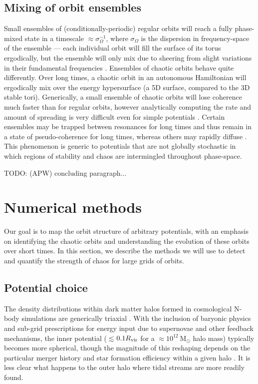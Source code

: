 \documentclass[letterpaper,12pt,preprint]{aastex}
\newcommand{\msun}{\ensuremath{\mathrm{M}_\odot}}
\newcommand{\todo}[2]{{\color{red} TODO: (\MakeUppercase{#1}) #2}}
\begin{document}
\subsection{Mixing of orbit ensembles}

Small ensembles of (conditionally-periodic) regular orbits will reach a fully phase-mixed state in a timescale  $\approx\sigma_\Omega^{-1}$, where $\sigma_\Omega$ is the dispersion in frequency-space of the ensemble --- each individual orbit will fill the surface of its torus ergodically, but the ensemble will only mix due to sheering from slight variations in their fundamental frequencies \citep{merritt96, helmi99}. Ensembles of chaotic orbits behave quite differently. Over long times, a chaotic orbit in an autonomous Hamiltonian will ergodically mix over the energy hypersurface (a 5D surface, compared to the 3D stable tori). Generically, a small ensemble of chaotic orbits will lose coherence much faster than for regular orbits, however analytically computing the rate and amount of spreading is very difficult even for simple potentials \cite[see, e.g.,][]{chirikov??}. Certain ensembles may be trapped between resonances for long times and thus remain in a state of pseudo-coherence for long times, whereas others may rapidly diffuse \citep[see, e.g.,][]{merritt96}. This phenomenon is generic to potentials that are not globally stochastic in which regions of stability and chaos are intermingled throughout phase-space. 

\todo{apw}{concluding paragraph...}

\section{Numerical methods}\label{sec:methods}

Our goal is to map the orbit structure of arbitrary potentials, with an emphasis on identifying the chaotic orbits and understanding the evolution of these orbits over short times. In this section, we describe the methods we will use to detect and quantify the strength of chaos for large grids of orbits.

\subsection{Potential choice}\label{sec:potential}

The density distributions within dark matter halos formed in cosmological N-body simulations are generically triaxial \citep[e.g.,][]{jing02, bett07, zemp09, veraciro11}. With the inclusion of baryonic physics and sub-grid prescriptions for energy input due to supernovae and other feedback mechanisms, the inner potential ($\lesssim$$0.1R_{\rm vir}$ for a $\approx$$10^{12}~\msun$ halo mass) typically becomes more spherical, though the magnitude of this reshaping depends on the particular merger history and star formation efficiency within a given halo \citep[e.g.,][]{dubinski??, butsky15}. It is less clear what happens to the outer halo where tidal streams are more readily found. %
\end{document}
